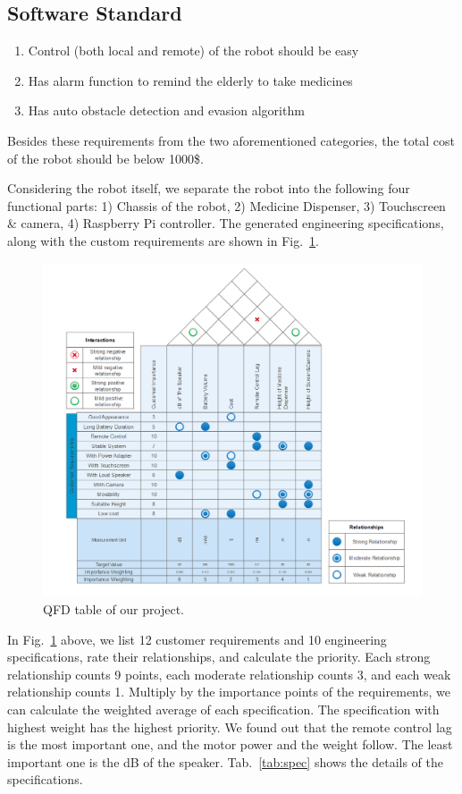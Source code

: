 \documentclass[12pt]{article}
\begin{document}
{\subsection{Software Standard}
\begin{enumerate}
	\item Control (both local and remote) of the robot should be easy 
	\item Has alarm function to remind the elderly to take medicines
	\item Has auto obstacle detection and evasion algorithm 
\end{enumerate}

Besides these requirements from the two aforementioned categories, the total cost of the robot should be below 1000\$.

Considering the robot itself, we separate the robot into the following four functional parts: 1) Chassis of the robot, 2) Medicine Dispenser, 3) Touchscreen \& camera, 4) Raspberry Pi controller. The generated engineering specifications, along with the custom requirements are shown in Fig.~\ref{fig::qfd}.}

\begin{figure}[H]
	
	\centering
	\includegraphics[width=5in]{Z5}
	\caption{QFD table of our project.}
	\label{fig::qfd}

\end{figure}
   In Fig.~\ref{fig::qfd} above, we list 12 customer requirements and 10 engineering specifications, rate their relationships, and calculate the priority. Each strong relationship counts 9 points, each moderate relationship counts 3, and each weak relationship counts 1. Multiply by the importance points of the requirements, we can calculate the weighted average of each specification. The specification with highest weight has the highest priority. We found out that the remote control lag is the most important one, and the motor power and the weight follow. The least important one is the dB of the speaker. Tab.~\ref{tab:spec} shows the details of the specifications.
\end{document}
